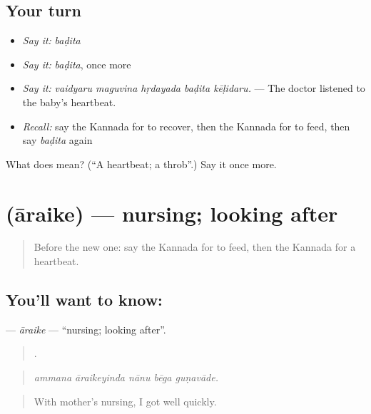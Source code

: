 \subsection*{Your turn}
\begin{itemize}
\raggedright
  \item \emph{Say it:} \emph{baḍita}
  \item \emph{Say it:} \emph{baḍita}, once more
  \item \emph{Say it:} \emph{vaidyaru maguvina hṛdayada baḍita kēḷidaru.} — The doctor listened to the baby's heartbeat.
  \item \emph{Recall:} say the Kannada for to recover, then the Kannada for to feed, then say \emph{baḍita} again
\end{itemize}

\begin{tcolorbox}[breakable,colback=teal!4,colframe=teal!35!black,title={Before you move on}]
What does  mean? (\textquotedblleft{}A heartbeat; a throb\textquotedblright{}.) Say it once more.
\end{tcolorbox}
\section[\texorpdfstring{\kn{ಆರೈಕೆ} (āraike)}{ಆರೈಕೆ (āraike)}]{ (āraike) — nursing; looking after}

\label{lesson:KA-C513-araike}



\begin{quote}
Before the new one: say the Kannada for to feed, then the Kannada for a heartbeat.
\end{quote}

\subsection*{You'll want to know: }
\textbf{} — \emph{āraike} — \textquotedblleft{}nursing; looking after\textquotedblright{}.

\begin{quote}
    .
\end{quote}

\begin{quote}
\emph{ammana āraikeyinda nānu bēga guṇavāde.}
\end{quote}

\begin{quote}
With mother's nursing, I got well quickly.
\end{quote}

